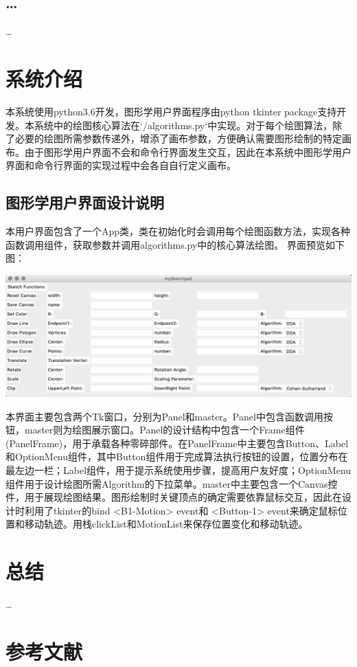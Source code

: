 \documentclass[a4paper,UTF8]{article}
\theoremstyle{definition}
\begin{document}
\subsection{\dots}
\dots
		
\section{系统介绍}
本系统使用python3.6开发，图形学用户界面程序由python tkinter package支持开发。本系统中的绘图核心算法在`/algorithms.py`中实现。对于每个绘图算法，除了必要的绘图所需参数传递外，增添了画布参数，方便确认需要图形绘制的特定画布。由于图形学用户界面不会和命令行界面发生交互，因此在本系统中图形学用户界面和命令行界面的实现过程中会各自自行定义画布。
\subsection{图形学用户界面设计说明}
本用户界面包含了一个App类，类在初始化时会调用每个绘图函数方法，实现各种函数调用组件，获取参数并调用algorithms.py中的核心算法绘图。
界面预览如下图：

\includegraphics{picture/gui_1st.jpg}

本界面主要包含两个Tk窗口，分别为Panel和master。Panel中包含函数调用按钮，master则为绘图展示窗口。Panel的设计结构中包含一个Frame组件(PanelFrame)，用于承载各种零碎部件。在PanelFrame中主要包含Button、Label和OptionMenu组件，其中Button组件用于完成算法执行按钮的设置，位置分布在最左边一栏；Label组件，用于提示系统使用步骤，提高用户友好度；OptionMenu组件用于设计绘图所需Algorithm的下拉菜单。master中主要包含一个Canvas控件，用于展现绘图结果。图形绘制时关键顶点的确定需要依靠鼠标交互，因此在设计时利用了tkinter的bind <B1-Motion> event和 <Button-1> event来确定鼠标位置和移动轨迹。用栈clickList和MotionList来保存位置变化和移动轨迹。

\section{总结}
\dots


\section{参考文献}

	
	
	
	
\end{document}
